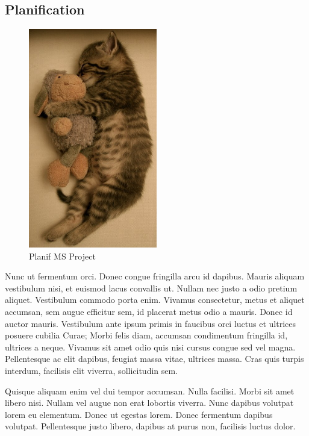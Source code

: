 	\subsection{Planification}
		\begin{figure}
			\begin{center}
				\includegraphics[width=0.5\textwidth]{figure/planif.jpg}
			\end{center}
			\caption{Planif MS Project}
			\label{fig:planif}
		\end{figure}

		Nunc ut fermentum orci. Donec congue fringilla arcu id dapibus. Mauris aliquam vestibulum nisi, et euismod lacus convallis ut. Nullam nec justo a odio pretium aliquet. Vestibulum commodo porta enim. Vivamus consectetur, metus et aliquet accumsan, sem augue efficitur sem, id placerat metus odio a mauris. Donec id auctor mauris. Vestibulum ante ipsum primis in faucibus orci luctus et ultrices posuere cubilia Curae; Morbi felis diam, accumsan condimentum fringilla id, ultrices a neque. Vivamus sit amet odio quis nisi cursus congue sed vel magna. Pellentesque ac elit dapibus, feugiat massa vitae, ultrices massa. Cras quis turpis interdum, facilisis elit viverra, sollicitudin sem.

		Quisque aliquam enim vel dui tempor accumsan. Nulla facilisi. Morbi sit amet libero nisi. Nullam vel augue non erat lobortis viverra. Nunc dapibus volutpat lorem eu elementum. Donec ut egestas lorem. Donec fermentum dapibus volutpat. Pellentesque justo libero, dapibus at purus non, facilisis luctus dolor. 


